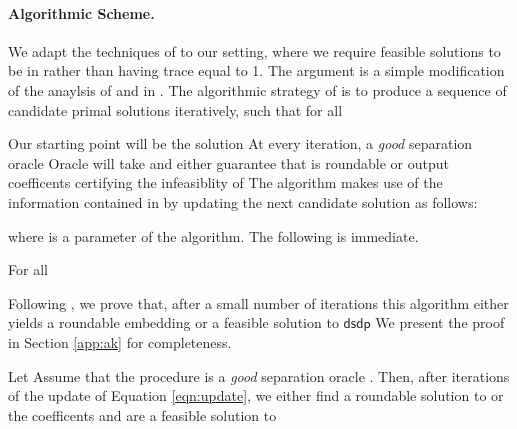 \documentclass[twoside,leqno,twocolumn]{article}
\numberwithin{equation}{section}
\newcommand{\dsdp}{{\ensuremath{\mathsf{dsdp}}\xspace}}
\begin{document}
\begin{comment}
More formally \Authormarginnote{Lorenzo}{and specifically to our case, must emphasize otherwise confusing, must say slight modification, these are our defintions}, let  be the set of feasible solutions to   A -separation oracle is an algorithm that, given  as input, checks wether  is "close" to  In our case,  is considered "close" to  if it can be rounded w.h.p. to produce a -balanced cut of conductance 
If  is not "close" to  a -separation oracle exhibits a separating hyperplane by outputing  such that  and 
A separation oracle has  width if, in the case that  is not "close" to  the output coefficents  obey 
\end{comment}

\paragraph{Algorithmic Scheme.} 
We adapt the techniques of \cite{AK} to our setting, where we require feasible solutions to be in  rather than having trace equal to 1.  The argument is a simple modification of the anaylsis of \cite{AK} and in \cite{Steurer}.
The algorithmic strategy of \cite{AK} is to produce a sequence of candidate primal solutions  iteratively, such that  for all  

Our starting point  will be the solution  
At every iteration, a {\it good} separation oracle {\sc Oracle}\xspace will take  and either guarantee that  is roundable or output coefficents  certifying the infeasiblity of  The algorithm makes use of the information contained in  by updating the next candidate solution as follows:

where  is a parameter of the algorithm. The following is immediate.
\begin{lemma}\label{lem:delta} For all  
\end{lemma}

\noindent
Following \cite{AK}, we prove that, after a small number of iterations this algorithm either yields a roundable embedding or a feasible solution to \dsdp
We present the proof in Section \ref{app:ak} for completeness.
\begin{theorem}\label{thm:ak}
Let  Assume that the procedure  is a {\it good} separation oracle . Then, after  iterations of the update of Equation \ref{eqn:update},  we either find a roundable solution to  or the coefficents   and  are a feasible solution to  
\end{theorem}
\end{document}
